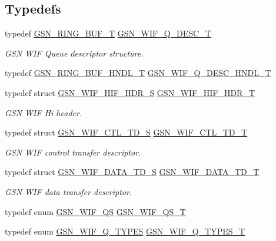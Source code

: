 \subsection*{Typedefs}
\begin{DoxyCompactItemize}
\item 
typedef \hyperlink{a00191}{GSN\_\-RING\_\-BUF\_\-T} \hyperlink{a00638_ga0cd2d946cd64e99973998fcac7dfc244}{GSN\_\-WIF\_\-Q\_\-DESC\_\-T}
\begin{DoxyCompactList}\small\item\em GSN WIF Queue descriptor structure. \end{DoxyCompactList}\item 
typedef \hyperlink{a00191}{GSN\_\-RING\_\-BUF\_\-HNDL\_\-T} \hyperlink{a00610_a1e30dabd05f45e796a3062085160d2a2}{GSN\_\-WIF\_\-Q\_\-DESC\_\-HNDL\_\-T}
\item 
typedef struct \hyperlink{a00337}{GSN\_\-WIF\_\-HIF\_\-HDR\_\-S} \hyperlink{a00638_gaccb177e96466ed182b099685113c9f70}{GSN\_\-WIF\_\-HIF\_\-HDR\_\-T}
\begin{DoxyCompactList}\small\item\em GSN WIF Hi header. \end{DoxyCompactList}\item 
typedef struct \hyperlink{a00322}{GSN\_\-WIF\_\-CTL\_\-TD\_\-S} \hyperlink{a00638_ga4b386895f3f1c0f28cd895ffd1e5fdfb}{GSN\_\-WIF\_\-CTL\_\-TD\_\-T}
\begin{DoxyCompactList}\small\item\em GSN WIF control transfer descriptor. \end{DoxyCompactList}\item 
typedef struct \hyperlink{a00325}{GSN\_\-WIF\_\-DATA\_\-TD\_\-S} \hyperlink{a00638_ga906c7cc219265ee9c61f1487fcd1bfcd}{GSN\_\-WIF\_\-DATA\_\-TD\_\-T}
\begin{DoxyCompactList}\small\item\em GSN WIF data transfer descriptor. \end{DoxyCompactList}\item 
typedef enum \hyperlink{a00610_a5b8e1c6bdba07349b5bd789fe8517c61}{GSN\_\-WIF\_\-QS} \hyperlink{a00610_a9d0e09456a07b17acc24bc23a4cd6318}{GSN\_\-WIF\_\-QS\_\-T}
\item 
typedef enum \hyperlink{a00610_abba8f1513c3343135d9334609ba7176a}{GSN\_\-WIF\_\-Q\_\-TYPES} \hyperlink{a00610_a70356467b56b9a88e2cf3d803b52d44d}{GSN\_\-WIF\_\-Q\_\-TYPES\_\-T}
\end{DoxyCompactItemize}
